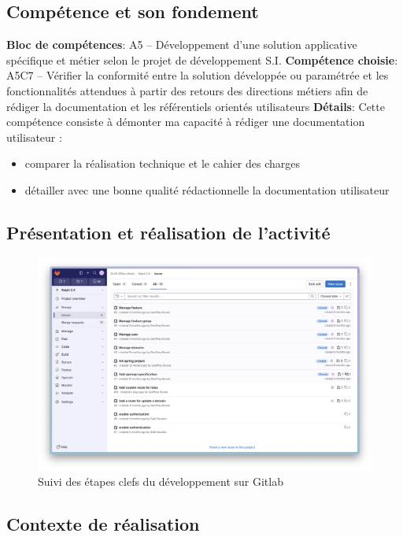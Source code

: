 \documentclass[a4paper, 11pt]{report}
\begin{document}
\subsection{Compétence et son fondement}
\textbf{Bloc de compétences}: A5 – Développement d’une solution applicative spécifique et métier selon le projet de développement S.I.
\newline
\textbf{Compétence choisie}: A5C7 – Vérifier la conformité entre la solution développée ou paramétrée et les fonctionnalités attendues à partir des retours des directions métiers afin de rédiger la documentation et les référentiels orientés utilisateurs
\newline
\textbf{Détails}: Cette compétence consiste à démonter ma capacité à rédiger une documentation utilisateur :
\begin{itemize}
  \item comparer la réalisation technique et le cahier des charges
  \item détailler avec une bonne qualité rédactionnelle la documentation utilisateur
\end{itemize}
\subsection{Présentation et réalisation de l'activité}
  \begin{figure}[H]
      \centering
      \includegraphics[scale=0.35,center]{screenshots/issues-gitlab.png}
      \caption{Suivi des étapes clefs du développement sur Gitlab}
  \end{figure}
\subsection{Contexte de réalisation}
\end{document}

